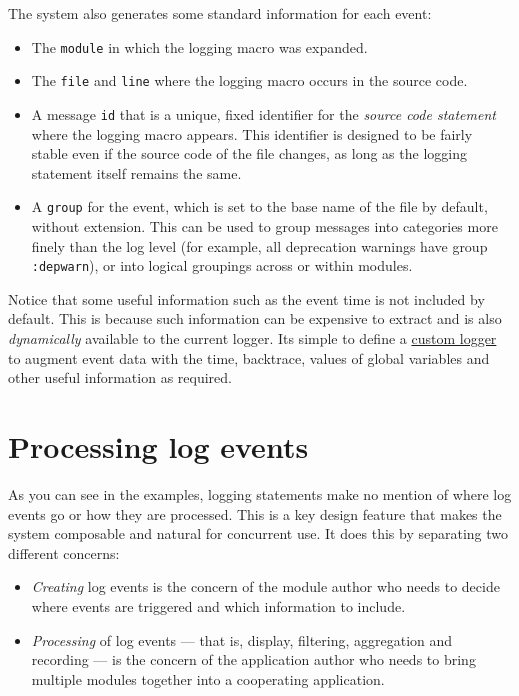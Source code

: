The system also generates some standard information for each event:



\begin{itemize}
\item The \texttt{module} in which the logging macro was expanded.


\item The \texttt{file} and \texttt{line} where the logging macro occurs in the source code.


\item A message \texttt{id} that is a unique, fixed identifier for the \emph{source code statement} where the logging macro appears. This identifier is designed to be fairly stable even if the source code of the file changes, as long as the logging statement itself remains the same.


\item A \texttt{group} for the event, which is set to the base name of the file by default, without extension.  This can be used to group messages into categories more finely than the log level (for example, all deprecation warnings have group \texttt{:depwarn}), or into logical groupings across or within modules.

\end{itemize}


Notice that some useful information such as the event time is not included by default. This is because such information can be expensive to extract and is also \emph{dynamically} available to the current logger. It{\textquotesingle}s simple to define a \hyperlink{8132992094414010061}{custom logger} to augment event data with the time, backtrace, values of global variables and other useful information as required.



\hypertarget{1246485954867051804}{}


\section{Processing log events}



As you can see in the examples, logging statements make no mention of where log events go or how they are processed. This is a key design feature that makes the system composable and natural for concurrent use. It does this by separating two different concerns:



\begin{itemize}
\item \emph{Creating} log events is the concern of the module author who needs to decide where events are triggered and which information to include.


\item \emph{Processing} of log events — that is, display, filtering, aggregation and recording — is the concern of the application author who needs to bring multiple modules together into a cooperating application.

\end{itemize}


